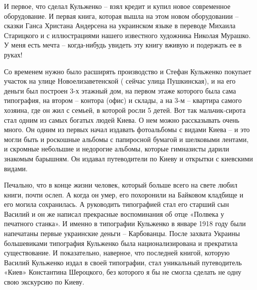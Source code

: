 И первое, что сделал Кульженко – взял кредит и купил новое современное
оборудование. И первая книга, которая вышла на этом новом оборудовании – сказки
Ганса Христана Андерсена на украинском языке в переводе Михаила Старицкого и с
иллюстрациями нашего известного художника Николая Мурашко. У меня есть мечта –
когда-нибудь увидеть эту книгу вживую и подержать ее в руках!

Со временем нужно было расширять производство и Стефан Кульженко покупает
участок на улице Новоелизаветенской ( сейчас улица Пушкинская),  и на его
деньги был построен 3-х этажный дом, на первом этаже которого была сама
типография, на втором – контора (офис) и склады, а на 3-м – квартира самого
хозяина, где он жил с семьей, в которой росли 5 детей. Вот так мальчик-сирота
стал одним из самых богатых людей Киева. О нем можно рассказывать очень много.
Он одним из первых начал издавать фотоальбомы с видами Киева – и это могли быть
и роскошные альбомы с папиросной бумагой и шелковыми лентами, и скромные
небольшие и недорогие альбомы, которые гимназисты дарили знакомым барышням. Он
издавал путеводители по Киеву и открытки с киевскими видами.

Печально, что в конце жизни человек, который больше всего на свете любил книги,
почти ослеп. А когда он умер, его похоронили на Байковом кладбище и его могила
сохранилась. А руководить типографией стал его старший сын Василий и он же
написал прекрасные воспоминания об отце «Полвека у печатного станка». И именно
в типографии Кульженко в январе 1918 году были напечатаны первые украинские
деньги – Карбованцы. После захвата Украины большевиками типография  Кульженко
была национализирована и прекратила существование. И показательно, наверное,
что последней книгой, которую Василий Кульженко издал в своей типографии, стал
уникальный путеводитель «Киев» Константина Шероцкого, без которого я бы не
смогла сделать не одну свою экскурсию по Киеву.
